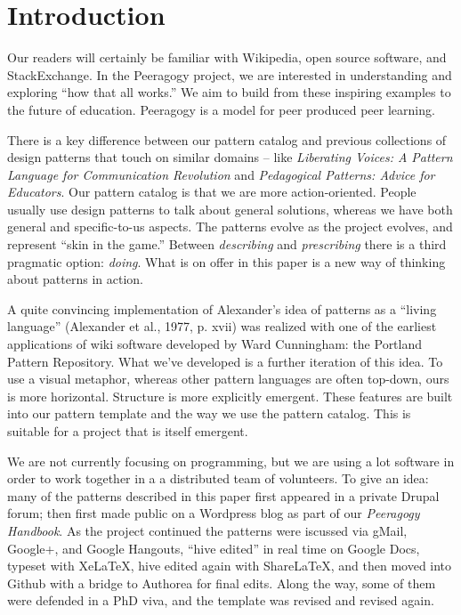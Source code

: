 \section{Introduction}

Our readers will certainly be familiar with Wikipedia, open source software, and StackExchange.  In the Peeragogy project, we are interested in understanding and exploring ``how that all works.''  We aim to build from these inspiring examples to the future of education.  Peeragogy is a model for peer produced peer learning.

There is a key difference between our pattern catalog and previous collections of design patterns that touch on similar domains -- like \emph{Liberating Voices: A Pattern Language for Communication Revolution} and \emph{Pedagogical Patterns: Advice for Educators}.  Our pattern catalog is that we are more action-oriented.  People usually use design patterns to talk about general solutions, whereas we have both general and specific-to-us aspects. The patterns evolve as the project evolves, and represent ``skin in the game.''   Between \emph{describing} and \emph{prescribing} there is a third pragmatic option: \emph{doing}.   What is on offer in this paper is a new way of thinking about patterns in action.

A quite convincing implementation of Alexander’s idea of patterns as a “living language” (Alexander et
al., 1977, p. xvii) was realized with one of the earliest applications of wiki
software developed by Ward Cunningham: the Portland Pattern Repository.
What we've developed is a further iteration of this idea. To use a visual metaphor, whereas other pattern languages are often top-down, ours is more horizontal.  Structure is more explicitly emergent.  These features are built
into our pattern template and the way we use the pattern catalog.  This is suitable for a project
that is itself emergent.

We are not currently focusing on programming, but we are using a lot software in order to work together in a a distributed team of volunteers.  To give an idea: many of the patterns described in this paper first appeared in a private Drupal forum; then first made public on a Wordpress blog as part of our \emph{Peeragogy Handbook}.  As the project continued the patterns were iscussed via gMail, Google+, and Google Hangouts, ``hive edited'' in real time on Google Docs, typeset with XeLaTeX, hive edited again with ShareLaTeX, and then moved into Github with a bridge to Authorea for final edits. Along the way, some of them were defended in a PhD viva, and the template was revised and revised again. 

